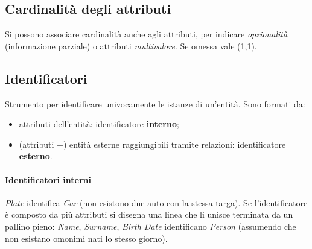 \documentclass[a4paper,12pt]{article}
\begin{document}
\subsection{Cardinalità degli attributi}

Si possono associare cardinalità anche agli attributi, per indicare
\emph{opzionalità} (informazione parziale) o attributi \emph{multivalore}. Se
omessa vale (1,1).
\begin{center}
\end{center}

\subsection{Identificatori}

Strumento per identificare univocamente le istanze di un'entità. Sono formati
da:
\begin{itemize}
  \item attributi dell'entità: identificatore \textbf{interno};
  \item (attributi +) entità esterne raggiungibili tramite relazioni:
    identificatore \textbf{esterno}.
\end{itemize}

\paragraph{Identificatori interni} \emph{Plate} identifica \emph{Car} (non
esistono due auto con la stessa targa). Se l'identificatore è composto da più
attributi si disegna una linea che li unisce terminata da un pallino pieno:
\emph{Name}, \emph{Surname}, \emph{Birth Date} identificano \emph{Person}
(assumendo che non esistano omonimi nati lo stesso giorno).
\begin{center}
\end{center}
\end{document}
